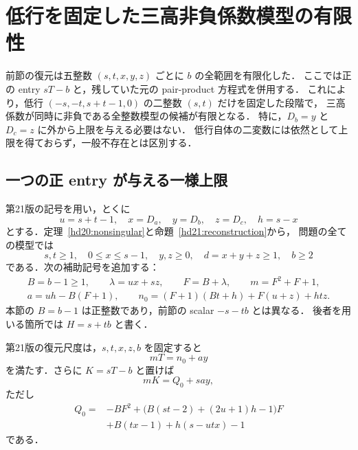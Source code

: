 \section{低行を固定した三高非負係数模型の有限性}
\label{hd22:section}

前節の復元は五整数 $(s,t,x,y,z)$ ごとに $b$ の全範囲を有限化した．
ここでは正の entry $sT-b$ と，残していた元の pair-product 方程式を併用する．
これにより，低行 $(-s,-t,s+t-1,0)$ の二整数 $(s,t)$ だけを固定した段階で，
三高係数が同時に非負である全整数模型の候補が有限となる．
特に，$D_b=y$ と $D_c=z$ に外から上限を与える必要はない．
低行自体の二変数には依然として上限を得ておらず，一般不存在とは区別する．

\subsection{一つの正 entry が与える一様上限}

第21版の記号を用い，とくに
\[
 u=s+t-1,\quad x=D_a,\quad y=D_b,\quad z=D_c,\quad h=s-x
\]
とする．定理~\ref{hd20:nonsingular}と命題~\ref{hd21:reconstruction}から，
問題の全ての模型では
\[
 s,t\ge1,\quad 0\le x\le s-1,\quad y,z\ge0,\quad
 d=x+y+z\ge1,\quad b\ge2
\]
である．次の補助記号を追加する：
\begin{equation}\label{hd22:basic}
 \begin{gathered}
 B=b-1\ge1,\qquad \lambda=ux+sz,\qquad F=B+\lambda,\qquad
 m=F^2+F+1,\\
 a=uh-B(F+1),\qquad
 n_0=(F+1)(Bt+h)+F(u+z)+htz.
 \end{gathered}
\end{equation}
本節の $B=b-1$ は正整数であり，前節の scalar $-s-tb$ とは異なる．
後者を用いる箇所では $H=s+tb$ と書く．

\begin{lemma}[第二尺度の係数分離]
\label{hd22:T-affine}
第21版の復元尺度は，$s,t,x,z,b$ を固定すると
\begin{equation}\label{hd22:T-affine-eq}
 mT=n_0+ay
\end{equation}
を満たす．さらに $K=sT-b$ と置けば
\begin{equation}\label{hd22:K-numerator}
 mK=Q_0+say,
\end{equation}
ただし
\begin{equation}\label{hd22:Q0}
 \begin{aligned}
 Q_0={}&-BF^2+
 \bigl(B(st-2)+(2u+1)h-1\bigr)F\\
 &+B(tx-1)+h(s-utx)-1
 \end{aligned}
\end{equation}
である．
\end{lemma}

